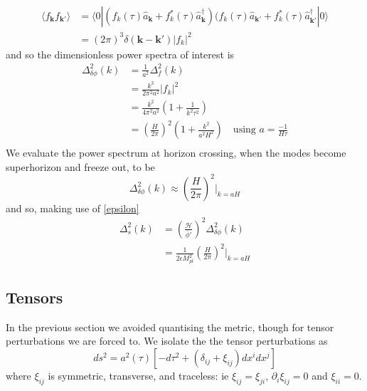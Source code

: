\documentclass[a4paper,10pt]{article}
\renewcommand{\v}[1]{\mathbf{#1}}
\newcommand{\Mp}{M_{pl}}
\newcommand{\bphi}{\bar{\phi}}
\newcommand{\ann}[1]{\hat{a}_{\v{#1}}}
\newcommand{\cre}[1]{\hat{a}^\dagger_{\v{#1}}}
\newcommand{\fint}[1]{\int \frac{d^3 \v{#1}}{(2\pi)^3}}
\begin{document}
%
\begin{equation}
\begin{split}
\langle f_{\v{k}}f_{\v{k'}}\rangle &= \langle 0| (f_k(\tau)\ann{k}+f_k^*(\tau)\cre{k})(f_k(\tau)\ann{k'}+f_k^*(\tau)\cre{k'}|0\rangle \\
&= (2\pi)^3\delta(\v{k}-\v{k'})|f_k|^2
\end{split}
\end{equation}
and so the dimensionless power spectra of interest is  
\begin{equation}\begin{split}
\Delta^2_{\delta\phi}(k) &= \frac{1}{a^2}\Delta^2_f(k)\\
&= \frac{k^3}{2\pi^2a^2}|f_k|^2\\
&=\frac{k^2}{4\pi^2a^2}\left(1+\frac{1}{k^2\tau^2}\right)\\
&=\left(\frac{H}{2\pi}\right)^2\left(1+\frac{k^2}{a^2H^2}\right) \quad \text{using $a=\frac{-1}{H\tau}$}\\
\label{inflatonpower}
\end{split}\end{equation}
We evaluate the power spectrum at horizon crossing, when the modes become superhorizon and freeze out, to be
\begin{equation}
\Delta^2_{\delta\phi}(k) \approx (\frac{H}{2\pi})^2\rvert_{k=aH}
\end{equation}
and so, making use of \ref{epsilon}
\begin{equation}\begin{split}
\Delta^2_s(k) &=\left(\frac{\mathcal{H}}{\bphi'}\right)^2\Delta^2_{\delta\phi}(k)\\
&=\frac{1}{2\epsilon\Mp^2}\left(\frac{H}{2\pi}\right)^2\rvert_{k=aH}
\end{split}\end{equation}


\subsection{Tensors}

In the previous section we avoided quantising the metric, though for tensor perturbations we are forced to. We isolate the the tensor perturbations as 
\begin{equation}
ds^2 = a^2(\tau)[-d\tau^2 + (\delta_{ij}+\xi_{ij})dx^idx^j]
\end{equation}
where $\xi_{ij}$ is symmetric, transverse, and traceless: ie $\xi_{ij}=\xi_{ji}$, $\partial_i\xi_{ij}=0$ and $\xi_{ii}=0$.\\
\end{document}
